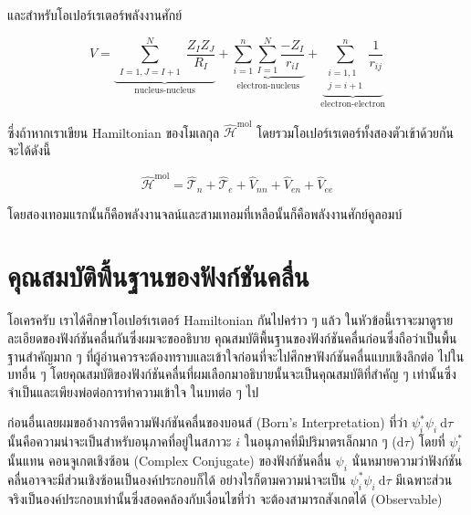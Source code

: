\noindent และสำหรับโอเปอร์เรเตอร์พลังงานศักย์

\begin{equation}
    \label{eq:potential_operator_au}
    \hat{V} 
    = \underbrace{\sum_{\substack{I=1, J=I+1}}^N \frac{Z_I Z_J}{R_I}}_{\text{nucleus-nucleus}} 
        + \underbrace{\sum_{i=1}^n \sum_{I=1}^N \frac{-Z_I}{r_{i I}}}_{\text{electron-nucleus}} 
        + \underbrace{\sum_{\substack{i=1,1 \\ j=i+1}}^n \frac{1}{r_{i j}}}_{\text{electron-electron}}
\end{equation}

\noindent ซึ่งถ้าหากเราเขียน Hamiltonian ของโมเลกุล $\hat{\mathscr{H}}^{\mathrm{mol}}$ โดยรวมโอเปอร์เรเตอร์ทั้งสองตัวเข้าด้วยกัน 
จะได้ดังนี้

\begin{equation}
    \label{eq:hamiltonian_operator_molecule}
    \hat{\mathscr{H}}^{\mathrm{mol}} 
    = \hat{\mathscr{T}}_n 
        + \hat{\mathscr{T}}_e 
        + \hat{V}_{n n} 
        + \hat{V}_{e n} 
        + \hat{V}_{e e}
\end{equation}

\noindent โดยสองเทอมแรกนั้นก็คือพลังงานจลน์และสามเทอมที่เหลือนั้นก็คือพลังงานศักย์คูลอมบ์

\section{คุณสมบัติพื้นฐานของฟังก์ชันคลื่น}

โอเครครับ เราได้ศึกษาโอเปอร์เรเตอร์ Hamiltonian กันไปคร่าว ๆ แล้ว ในหัวข้อนี้เราจะมาดูรายละเอียดของฟังก์ชันคลื่นกันซึ่งผมจะขออธิบาย%
คุณสมบัติพื้นฐานของฟังก์ชันคลื่นก่อนซึ่งถือว่าเป็นพื้นฐานสำคัญมาก ๆ ที่ผู้อ่านควรจะต้องทราบและเข้าใจก่อนที่จะไปศึกษาฟังก์ชันคลื่นแบบเชิงลึกต่อ%
ไปในบทอื่น ๆ โดยคุณสมบัติของฟังก์ชันคลื่นที่ผมเลือกมาอธิบายนั้นจะเป็นคุณสมบัติที่สำคัญ ๆ เท่านั้นซึ่งจำเป็นและเพียงพ่อต่อการทำความเข้าใจ%
ในบทต่อ ๆ ไป

ก่อนอื่นเลยผมขออ้างการตีความฟังก์ชันคลื่นของบอนส์ (Born's Interpretation) ที่ว่า $\psi_i^* \psi_i \mathrm{~d} \tau$ 
นั้นคือความน่าจะเป็นสำหรับอนุภาคที่อยู่ในสภาวะ $i$ ในอนุภาคที่มีปริมาตรเล็กมาก ๆ ($\mathrm{d} \tau$) โดยที่ $\psi_i^*$ นั้นแทน%
คอนจูเกตเชิงซ้อน (Complex Conjugate) ของฟังก์ชันคลื่น $\psi_i$ นั่นหมายความว่าฟังก์ชันคลื่นอาจจะมีส่วนเชิงซ้อนเป็นองค์ประกอบก็ได้ 
อย่างไรก็ตามความน่าจะเป็น $\psi_i^* \psi_i \mathrm{~d} \tau$ มีเฉพาะส่วนจริงเป็นองค์ประกอบเท่านั้นซึ่งสอดคล้องกับเงื่อนไขที่ว่า%
จะต้องสามารถสังเกตได้ (Observable) 

